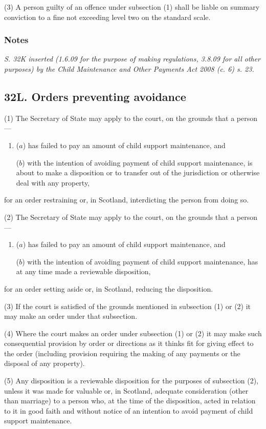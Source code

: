 \documentclass[a4paper]{article}
\newcommand\amendment[1]{\subsubsection*{Notes}{\itshape\frenchspacing\footnotesize #1 \par}}
\begin{document}
(3)
A person guilty of an offence under subsection (1) shall be liable on summary conviction to a fine not exceeding level two on the standard scale.

\amendment{
S. 32K inserted (1.6.09 for the purpose of making regulations, 3.8.09 for all other purposes) by the Child Maintenance and Other Payments Act 2008 (c. 6)
s. 23.
}

\subsection{32L. Orders preventing avoidance}

(1) The Secretary of State may apply to the court, on the grounds that a person---
\begin{enumerate}\item[]
($a$) has failed to pay an amount of child support maintenance, and

($b$) with the intention of avoiding payment of child support maintenance, is about to make a disposition or to transfer out of the jurisdiction or otherwise deal with any property,
\end{enumerate}
for an order restraining or, in Scotland, interdicting the person from doing so.

(2) The Secretary of State may apply to the court, on the grounds that a person---
\begin{enumerate}\item[]
($a$) has failed to pay an amount of child support maintenance, and

($b$) with the intention of avoiding payment of child support maintenance, has at any time made a reviewable disposition,
\end{enumerate}
for an order setting aside or, in Scotland, reducing the disposition.

(3)
If the court is satisfied of the grounds mentioned in subsection (1) or (2) it may make an order under that subsection.

(4)
Where the court makes an order under subsection (1) or (2) it may make such consequential provision by order or directions as it thinks fit for giving effect to the order (including provision requiring the making of any payments or the disposal of any property).

(5)
Any disposition is a reviewable disposition for the purposes of subsection (2), unless it was made for valuable or, in Scotland, adequate consideration (other than marriage) to a person who, at the time of the disposition, acted in relation to it in good faith and without notice of an intention to avoid payment of child support maintenance.
\end{document}
